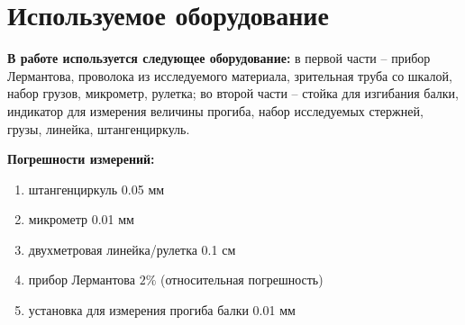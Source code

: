 \documentclass[a4paper,12pt]{article} %
\begin{document}
\section{Используемое оборудование}
\textbf{В работе используется следующее оборудование:} в первой части -- прибор Лермантова, проволока из исследуемого материала, зрительная труба со шкалой,
набор грузов, микрометр, рулетка; во второй части -- стойка для
изгибания балки, индикатор для измерения величины прогиба, набор
исследуемых стержней, грузы, линейка, штангенциркуль.

\textbf{Погрешности измерений:}  \begin{enumerate}
    \item штангенциркуль 0.05 мм
    \item микрометр 0.01 мм
    \item двухметровая линейка/рулетка 0.1 см
    \item прибор Лермантова $ 2\% $ (относительная погрешность)
    \item установка для измерения прогиба балки 0.01 мм 
\end{enumerate}
\end{document}
